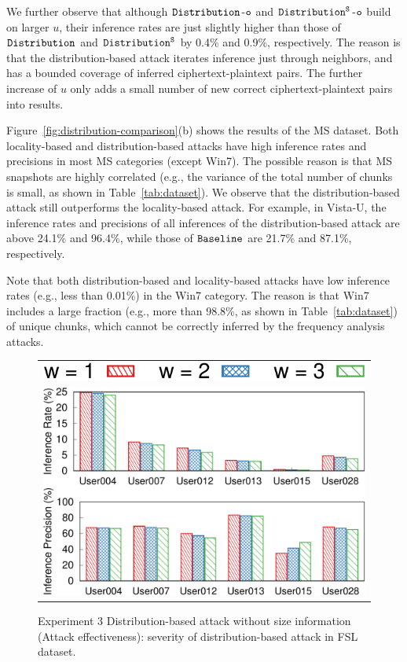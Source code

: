 We further observe that although $\tt Distribution$-$\tt o$ and $\tt
Distribution^S$-$\tt o$ build on larger $u$, their inference rates are just
slightly higher than those of $\tt Distribution$ and $\tt Distribution^S$ by
0.4\% and 0.9\%, respectively. The reason is that the distribution-based
attack iterates inference just through neighbors, and has a bounded coverage
of inferred ciphertext-plaintext pairs. The further increase of $u$ only adds
a small number of new correct  ciphertext-plaintext pairs into results. 

Figure~\ref{fig:distribution-comparison}(b) shows the
results of the MS dataset. Both locality-based and distribution-based attacks
have high inference rates and precisions in most MS categories (except Win7).
The possible reason is that MS snapshots are highly correlated (e.g., the
variance of the total number of chunks is small, as shown in
Table~\ref{tab:dataset}).  We observe that the distribution-based attack still
outperforms the locality-based attack. For example, in Vista-U, the inference
rates and precisions of all inferences of the distribution-based attack are
above 24.1\% and 96.4\%, while those of $\tt Baseline$ are 21.7\% and 87.1\%,
respectively. 

Note that both  distribution-based and  locality-based attacks have low
inference rates (e.g., less than 0.01\%) in the Win7 category. The reason is
 that Win7 includes a large fraction (e.g., more than 98.8\%, as shown in
Table~\ref{tab:dataset}) of unique chunks, which cannot be correctly
inferred by the frequency analysis attacks. 




\begin{figure}[t]
     \centering
    \centering
    \begin{tabular}{c}
        \includegraphics[width=.35\textwidth]{pic/legend-effectiveness.pdf}\\
        \includegraphics[width=.7\textwidth]{pic/distribution-effectiveness-wo-size.pdf}
    \end{tabular}
	\caption{Experiment 3 Distribution-based attack without size information  (Attack effectiveness): severity of distribution-based attack in FSL dataset.}
	\label{fig:experiment-distribution-effectiveness}
\end{figure}

